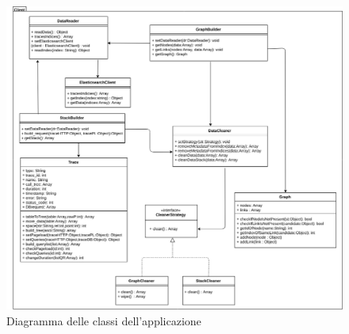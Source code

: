\begin{figure}[H]
    \centering
    \includegraphics[width=1\textwidth]{Images/classi.png}
    \caption{Diagramma delle classi dell'applicazione}
    \label{img:diagrammaClassiClient}
\end{figure}


